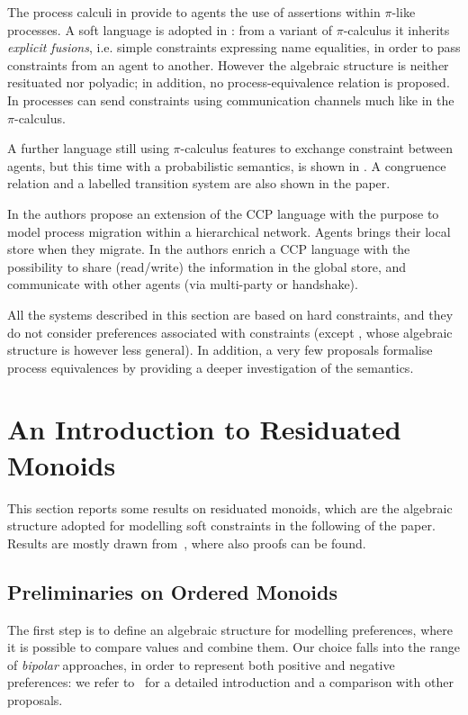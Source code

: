 \documentclass{llncs}
\begin{document}
The process calculi in \cite{parrowlics,buscemi} provide  to agents the use of assertions within $\pi$-like processes. A soft language is adopted in \cite{buscemi}: from a variant of $\pi$-calculus it inherits \emph{explicit fusions}, i.e. simple constraints expressing name equalities, in order to pass constraints from an agent to another.
 However the algebraic structure is neither resituated nor  polyadic; in addition, no process-equivalence relation is proposed.  In \cite{pi1,pi2}  processes can send constraints using communication channels much like in the $\pi$-calculus. 
 
 A further language still using $\pi$-calculus features to exchange constraint between agents, but this time with a probabilistic semantics, is shown in \cite{bortolussi}. A congruence relation and a labelled transition system are also shown in the paper. 

In \cite{catuscia} the authors propose an extension of the CCP language with the purpose to model process migration within a hierarchical network. Agents brings their local store when they migrate. In \cite{lubos} the authors enrich a CCP language with the possibility to share (read/write) the information in the global store, and communicate with other agents (via multi-party or handshake).

All the systems described in this section are based on hard constraints, and  they do not consider preferences associated with constraints (except \cite{buscemi}, whose algebraic structure is however less general). In addition, a very few proposals formalise process equivalences by providing a deeper investigation of the semantics.

\section{An Introduction to Residuated Monoids}\label{sec:bg}

This section reports some results on residuated monoids,
which are the algebraic structure adopted for modelling
soft constraints in the following of the paper.
Results are mostly drawn from~\cite{jlamp17}, where also proofs can be found.


\subsection{Preliminaries on Ordered Monoids}\label{sec:lem}

The first step is to define an algebraic structure for modelling preferences,
where it is possible to compare values and combine them.
Our choice falls into the range of \emph{bipolar} approaches, in order 
to represent both positive and negative preferences: 
we refer to~\cite{ipl17} for a detailed introduction and 
a comparison with other proposals.
\end{document}

